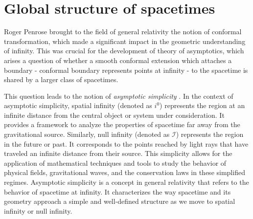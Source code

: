 \section{Global structure of spacetimes}
\label{section:Global structure of spacetimes}

Roger Penrose brought to the field of general relativity the notion of conformal transformation, which made a significant impact in the geometric understanding of infinity. This was crucial for the development of theory of asymptotics, which arises a question of whether a smooth conformal extension which attaches a boundary - conformal boundary represents points at infinity - to the spacetime is shared by a larger class of spacetimes. 

This question leads to the notion of \textit{asymptotic simplicity} \cite{Val16}. In the context of asymptotic simplicity, spatial infinity (denoted as $i^0$) represents the region at an infinite distance from the central object or system under consideration. It provides a framework to analyze the properties of spacetime far away from the gravitational source. Similarly, null infinity (denoted as $\mathscr{I}$) represents the region in the future or past. It corresponds to the points reached by light rays that have traveled an infinite distance from their source. This simplicity allows for the application of mathematical techniques and tools to study the behavior of physical fields, gravitational waves, and the conservation laws in these simplified regimes.
Asymptotic simplicity is a concept in general relativity that refers to the behavior of spacetime at infinity. It characterizes the way spacetime and its geometry approach a simple and well-defined structure as we move to spatial infinity or null infinity. 

